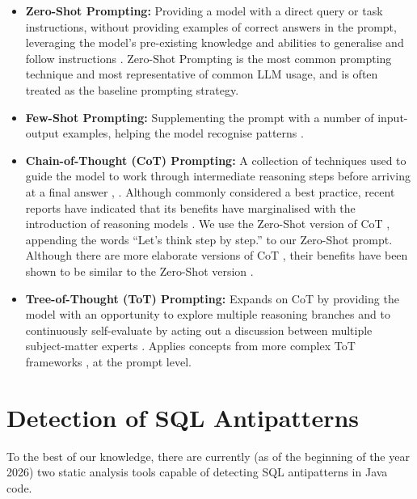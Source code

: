 \begin{itemize}
    \item \textbf{Zero-Shot Prompting:} Providing a model with a direct query or task instructions, without providing examples of correct answers in the prompt, leveraging the model's pre-existing knowledge and abilities to generalise and follow instructions . Zero-Shot Prompting is the most common prompting technique and most representative of common LLM usage, and is often treated as the baseline prompting strategy.
    \item \textbf{Few-Shot Prompting:} Supplementing the prompt with a number of input-output examples, helping the model recognise patterns .
    \item \textbf{Chain-of-Thought (CoT) Prompting:} A collection of techniques used to guide the model to work through intermediate reasoning steps before arriving at a final answer , . Although commonly considered a best practice, recent reports have indicated that its benefits have marginalised with the introduction of reasoning models . We use the Zero-Shot version of CoT , appending the words “Let's think step by step.” to our Zero-Shot prompt. Although there are more elaborate versions of CoT , their benefits have been shown to be similar to the Zero-Shot version .
    \item \textbf{Tree-of-Thought (ToT) Prompting:} Expands on CoT by providing the model with an opportunity to explore multiple reasoning branches and to continuously self-evaluate by acting out a discussion between multiple subject-matter experts . Applies concepts from more complex ToT frameworks ,  at the prompt level.
\end{itemize}

\section{Detection of SQL Antipatterns}\label{sec:sqlDetection}

To the best of our knowledge, there are currently (as of the beginning of the year 2026) two static analysis tools capable of detecting SQL antipatterns in Java code.

